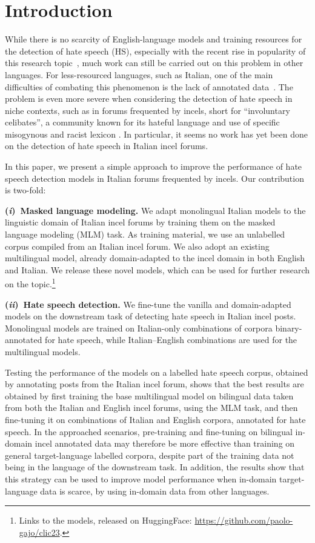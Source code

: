 \documentclass[
twocolumn,
]{ceurart}
\newcommand{\Ni}{(\textit{i})~}
\newcommand{\Nii}{(\textit{ii})~}
\begin{document}
\section{Introduction}

While there is no scarcity of English-language models and training resources for
the detection of hate speech (HS), especially with the recent rise in popularity of
this research topic~\cite{alkomahLiteratureReviewTextual2022},
much work can still be carried out on this problem in other languages.
For less-resourced languages, such as Italian, one of the main difficulties of combating this phenomenon is the lack of annotated data~\cite{van2023mitigating}. The problem is even more severe when considering the detection of hate speech in niche contexts,
such as in forums frequented by incels,
short for ``involuntary celibates'', a community known for its hateful language \cite{nagle-2017-kill-normies,jakiOnlineHatredWomen2019}
and use of
specific misogynous and racist lexicon \cite{farrellExploringMisogynyManosphere2019,gothard2020exploring}.
In particular, it seems no work has yet been done on the detection of hate speech in Italian incel forums.

In this paper, we present a simple approach to improve the performance of hate speech detection models in Italian forums frequented by incels. Our contribution is two-fold:

\noindent\textbf{\Ni Masked language modeling.} We adapt monolingual Italian models to the linguistic domain of Italian incel forums by training them on the masked language modeling (MLM) task. As training material, we use an unlabelled corpus compiled from an Italian incel forum. We also adopt an existing multilingual model, already domain-adapted to the incel domain in both English and Italian.
We release these novel models, which can be used for further research on the topic.\footnote{Links to the models, released on HuggingFace: \url{https://github.com/paolo-gajo/clic23}.}

\noindent\textbf{\Nii Hate speech detection.}
We fine-tune the vanilla and domain-adapted models on the downstream task of detecting hate speech in Italian incel posts.
Monolingual models are trained on Italian-only combinations of corpora binary-annotated for hate speech, while Italian--English combinations are used for the multilingual models.

Testing the performance of the models on a labelled hate speech corpus, obtained by annotating posts from the Italian incel forum, shows that the best results are obtained by first training the base multilingual model on bilingual data taken from both the Italian and English incel forums, using the MLM task, and then fine-tuning it on combinations of Italian and English corpora, annotated for hate speech. In the approached scenarios, pre-training and fine-tuning on bilingual in-domain incel annotated data may therefore be more effective than training on general target-language labelled corpora, despite part of the training data not being in the language of the downstream task. In addition, the results show that this strategy can be used to improve model performance when in-domain target-language data is scarce, by using in-domain data from other languages.
\end{document}
